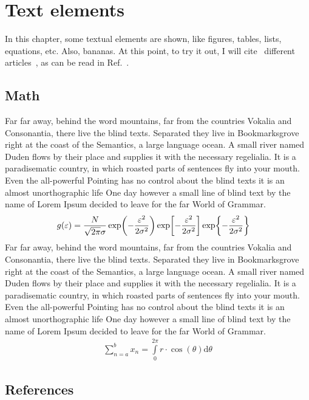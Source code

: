 \chapter{Text elements}
\label{cha:text-elements}

In this chapter, some textual elements are shown, like figures, tables,
lists, equations, etc. Also, bananas. At this point, to try it out, I will
cite~\cite{a} different articles~\cite{a,b,c}, as can be read in Ref.~\cite{b}.

\section{Math}
\label{sec:math}

Far far away, behind the word mountains, far from the countries Vokalia and
Consonantia, there live the blind texts. Separated they live in
Bookmarksgrove right at the coast of the Semantics, a large language
ocean. A small river named Duden flows by their place and supplies it with
the necessary regelialia. It is a paradisematic country, in which roasted
parts of sentences fly into your mouth. Even the all-powerful Pointing has
no control about the blind texts it is an almost unorthographic life One
day however a small line of blind text by the name of Lorem Ipsum decided
to leave for the far World of Grammar.
\begin{align}
    g(\varepsilon) &= \frac{N}{\sqrt{2\pi} \sigma}
    \exp\!\left(-\frac{\varepsilon^2}{2\sigma^2}\right)
    \exp\!\left[-\frac{\varepsilon^2}{2\sigma^2}\right]
    \exp\!\left\{-\frac{\varepsilon^2}{2\sigma^2}\right\} 
    \label{eq:eq1}
\end{align}
Far far away, behind the word mountains, far from the countries Vokalia and
Consonantia, there live the blind texts. Separated they live in
Bookmarksgrove right at the coast of the Semantics, a large language
ocean. A small river named Duden flows by their place and supplies it with
the necessary regelialia. It is a paradisematic country, in which roasted
parts of sentences fly into your mouth. Even the all-powerful Pointing has
no control about the blind texts it is an almost unorthographic life One
day however a small line of blind text by the name of Lorem Ipsum decided
to leave for the far World of Grammar.
\begin{align}
  \sum\limits^b_{n=a}x_n = \int\limits^{2\pi}_0 r\cdot \cos(\theta) \mathrm d \theta
\end{align}


\section{References}
\label{sec:refs}

